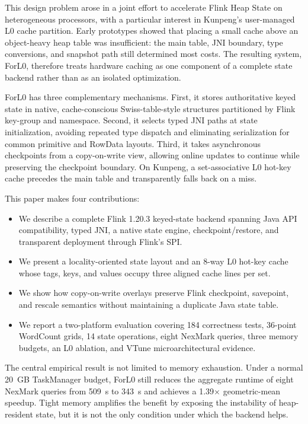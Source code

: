 \documentclass[sigconf]{acmart}
\newcommand{\forlzero}{ForL0\xspace}
\newcommand{\system}{\forlzero}
\begin{document}
This design problem arose in a joint effort to accelerate Flink Heap State on heterogeneous processors, with a particular interest in Kunpeng's user-managed L0 cache partition. Early prototypes showed that placing a small cache above an object-heavy heap table was insufficient: the main table, JNI boundary, type conversions, and snapshot path still determined most costs. The resulting system, \system, therefore treats hardware caching as one component of a complete state backend rather than as an isolated optimization.

\system has three complementary mechanisms. First, it stores authoritative keyed state in native, cache-conscious Swiss-table-style structures partitioned by Flink key-group and namespace. Second, it selects typed JNI paths at state initialization, avoiding repeated type dispatch and eliminating serialization for common primitive and RowData layouts. Third, it takes asynchronous checkpoints from a copy-on-write view, allowing online updates to continue while preserving the checkpoint boundary. On Kunpeng, a set-associative L0 hot-key cache precedes the main table and transparently falls back on a miss.

This paper makes four contributions:
\begin{itemize}
  \item We describe a complete Flink 1.20.3 keyed-state backend spanning Java API compatibility, typed JNI, a native state engine, checkpoint/restore, and transparent deployment through Flink's SPI.
  \item We present a locality-oriented state layout and an 8-way L0 hot-key cache whose tags, keys, and values occupy three aligned cache lines per set.
  \item We show how copy-on-write overlays preserve Flink checkpoint, savepoint, and rescale semantics without maintaining a duplicate Java state table.
  \item We report a two-platform evaluation covering 184 correctness tests, 36-point WordCount grids, 14 state operations, eight NexMark queries, three memory budgets, an L0 ablation, and VTune microarchitectural evidence.
\end{itemize}

The central empirical result is not limited to memory exhaustion. Under a normal 20~GB TaskManager budget, \system still reduces the aggregate runtime of eight NexMark queries from 509~s to 343~s and achieves a 1.39$\times$ geometric-mean speedup. Tight memory amplifies the benefit by exposing the instability of heap-resident state, but it is not the only condition under which the backend helps.
\end{document}

